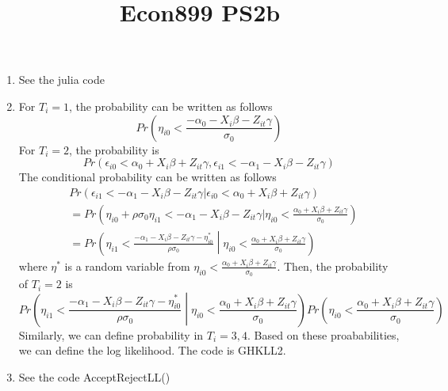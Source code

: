 \documentclass{article}
\title{Econ899 PS2b}
\begin{document}
\maketitle
\begin{enumerate}
\item See the julia code
\item For $T_i = 1$, the probability can be written as follows
  \begin{equation}
    \label{eq:1}
    Pr\left(\eta_{i0} < \frac{-\alpha_0 - X_i\beta - Z_{it}\gamma}{\sigma_0}\right)
  \end{equation}
  For $T_i = 2$, the probability is
  \begin{equation}
    \label{eq:2}
    Pr\left(\epsilon_{i0} < \alpha_0 + X_i\beta + Z_{it}\gamma, \epsilon_{i1} < - \alpha_1 - X_i\beta - Z_{it}\gamma \right)
  \end{equation}
  The conditional probability can be written as follows
  \begin{align*}
    & Pr\left(\epsilon_{i1} < - \alpha_1 - X_i\beta - Z_{it}\gamma |\epsilon_{i0} < \alpha_0 + X_i\beta + Z_{it}\gamma \right) \\  
    & = Pr\left(\eta_{i0} + \rho \sigma_0 \eta_{i1} < - \alpha_1 - X_i\beta - Z_{it}\gamma |\eta_{i0} < \frac{\alpha_0 + X_i\beta + Z_{it}\gamma}{\sigma_0} \right)\\
    & = Pr\left(\eta_{i1} < \frac{- \alpha_1 - X_i\beta - Z_{it}\gamma-\eta^*_{i0}}{\rho \sigma_0} \middle|\eta_{i0} < \frac{\alpha_0 + X_i\beta + Z_{it}\gamma}{\sigma_0} \right)
  \end{align*}
  where $\eta^*$ is a random variable from  $\eta_{i0} < \frac{\alpha_0 + X_i\beta + Z_{it}\gamma}{\sigma_0}$. Then, the probability of $T_i= 2$ is 
  \begin{equation}
    \label{eq:3}
    Pr\left(\eta_{i1} < \frac{- \alpha_1 - X_i\beta - Z_{it}\gamma-\eta^*_{i0}}{\rho \sigma_0} \middle|\eta_{i0} < \frac{\alpha_0 + X_i\beta + Z_{it}\gamma}{\sigma_0} \right) Pr\left(\eta_{i0} < \frac{\alpha_0 + X_i\beta + Z_{it}\gamma}{\sigma_0} \right) 
  \end{equation}
  Similarly, we can define probability in $T_i = 3,4$. Based on these proababilities, we can define the log likelihood. The code is GHKLL2. 

\item See the code AcceptRejectLL()


\end{enumerate}
\end{document}
